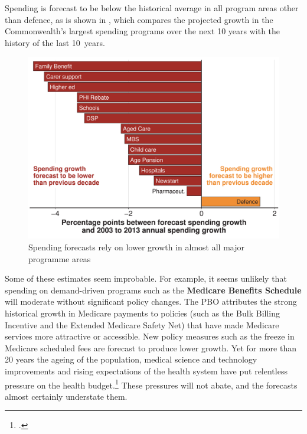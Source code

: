\documentclass{grattanAlpha}
\begin{document}
Spending is forecast to be below the historical average in all program areas other than defence, as is shown in , which compares the projected growth in the Commonwealth’s largest spending programs over the next 10 years with the history of the last 10~years. 

\begin{figure}
\caption{Spending forecasts rely on lower growth in almost all major programme areas\label{fig:FISCAL-8}}%
\includegraphics[width=\columnwidth]{figure/budget-repair-Figure8-altered-1.pdf}
\end{figure}

Some of these estimates seem improbable. For example, it seems unlikely that spending on demand-driven programs such as the \textbf{Medicare Benefits Schedule} will moderate without significant policy changes. The PBO attributes the strong historical growth in Medicare payments to policies (such as the Bulk Billing Incentive and the Extended Medicare Safety Net) that have made Medicare services more attractive or accessible. New policy measures such as the freeze in Medicare scheduled fees are forecast to produce lower growth. Yet for more than 20 years the ageing of the population, medical science and technology improvements and rising expectations of the health system have put relentless pressure on the health budget.\footcite{Daley2014}  These pressures will not abate, and the forecasts almost certainly understate them.
\end{document}

